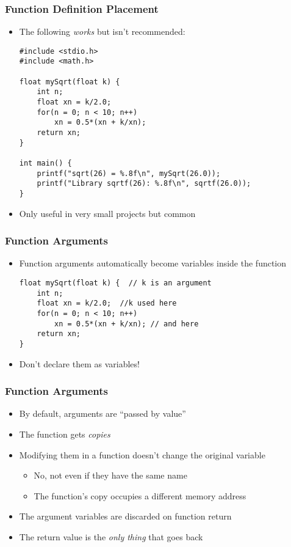 \documentclass[14pt]{beamer}
\begin{document}
\begin{frame}[fragile]
\frametitle{Function Definition Placement}
\begin{itemize}
\item The following \textit{works} but isn't recommended:
\begin{lstlisting}[style=CStyle,basicstyle=\ttfamily\scriptsize]
#include <stdio.h> 
#include <math.h> 

float mySqrt(float k) { 
	int n; 
	float xn = k/2.0; 
	for(n = 0; n < 10; n++) 
		xn = 0.5*(xn + k/xn); 
	return xn; 
}

int main() { 
	printf("sqrt(26) = %.8f\n", mySqrt(26.0)); 
	printf("Library sqrtf(26): %.8f\n", sqrtf(26.0)); 
}
\end{lstlisting}
\item Only useful in very small projects but common
\end{itemize}
\end{frame}

\begin{frame}[fragile]
\frametitle{Function Arguments}
\begin{itemize}
\item Function arguments automatically become variables inside the function
\begin{lstlisting}[style=CStyle]
float mySqrt(float k) {  // k is an argument
	int n; 
	float xn = k/2.0;  //k used here
	for(n = 0; n < 10; n++) 
		xn = 0.5*(xn + k/xn); // and here
	return xn; 
}
\end{lstlisting}
\item Don't declare them as variables!
\end{itemize}
\end{frame}

\begin{frame}
\frametitle{Function Arguments}
\begin{itemize}
\item By default, arguments are ``passed by value''
\item The function gets \textit{copies}
\item Modifying them in a function doesn't change the original variable
	\begin{itemize}
		\item No, not even if they have the same name
		\item The function's copy occupies a different memory address
	\end{itemize}
\item The argument variables are discarded on function return
\item The return value is the \textit{only thing} that goes back
\end{itemize}
\end{frame}
\end{document}
